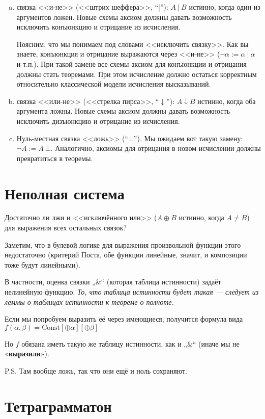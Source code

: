 \documentclass[12pt, a4paper]{article}
\begin{document}
\begin{enumerate}[(a)]
\item связка <<и-не>> (<<штрих шеффера>>, ``|''): $A\ |\ B$ истинно, когда один из аргументов ложен. Новые схемы аксиом должны 
давать возможность исключить конъюнкцию и отрицание из исчисления. 

Поясним, что мы понимаем под словами <<исключить связку>>.
Как вы знаете, конъюнкция и отрицание выражаются через <<и-не>> ($\neg \alpha := \alpha\ |\ \alpha$ и т.п.). 
При такой замене все схемы аксиом для конъюнкции и отрицания должны стать теоремами.
При этом исчисление должно остаться корректным относительно классической модели исчисления высказываний.

\item связка <<или-не>> (<<стрелка пирса>>, ``$\downarrow$''): $A \downarrow B$ истинно, когда оба аргумента ложны.
Новые схемы аксиом должны давать возможность исключить дизъюнкцию и отрицание из исчисления.
\item Нуль-местная связка <<ложь>> (``$\bot$''). Мы ожидаем вот такую замену: $\neg A := A \     \bot$.
Аналогично, аксиомы для отрицания в новом исчислении должны превратиться в теоремы. 
\end{enumerate}

\section{Неполная система} Достаточно ли лжи и <<исключённого или>> ($A \oplus B$ истинно, когда $A \ne B$) для выражения
всех остальных связок?

Заметим, что в булевой логике для выражения произвольной функции этого недостаточно
(критерий Поста, обе функции линейные, значит, и композиции тоже будут линейными).

В частности, оценка связки „$\&$“ (которая таблица истинности) задаёт нелинейную функцию. \textit{То, что таблица истинности будет такая 
— следует из леммы о таблицах истинности к теореме о полноте.}

Если мы попробуем выразить её через имеющиеся, получится формула вида $f(\alpha, \beta) = \mathrm{Const} [\oplus \alpha] [\oplus \beta]$

Но $f$ обязана иметь такую же таблицу истинности, как и „$\&$“ (иначе мы не «\textbf{выразили}»).

P.S. Там вообще ложь, так что они ещё и ноль сохраняют.


\section{Тетраграмматон}
\end{document}

